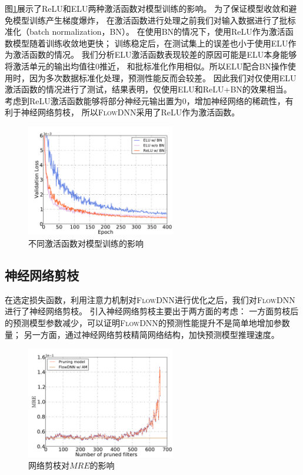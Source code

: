 图\ref{fig:activation}展示了ReLU和ELU两种激活函数对模型训练的影响。
为了保证模型收敛和避免模型训练产生梯度爆炸，
在激活函数进行处理之前我们对输入数据进行了批标准化（batch normalization，BN）。
在使用BN的情况下，使用ReLU作为激活函数模型随着训练收敛地更快；
训练稳定后，在测试集上的误差也小于使用ELU作为激活函数的情况。
我们分析ELU激活函数表现较差的原因可能是ELU本身能够将激活单元的输出均值往0推近，
和批标准化作用相似。所以ELU配合BN操作使用时，因为多次数据标准化处理，预测性能反而会较差。
因此我们对仅使用ELU激活函数的情况进行了测试，结果表明，仅使用ELU和ReLU+BN的效果相当。
考虑到ReLU激活函数能够将部分神经元输出置为0，增加神经网络的稀疏性，有利于神经网络剪枝，
所以\textsc{FlowDNN}采用了ReLU作为激活函数。

\begin{figure}[htp]
	\centering
	\includegraphics[width=0.58\textwidth]{./figures/data/activation_comp.pdf}
	\caption{不同激活函数对模型训练的影响}
	\label{fig:activation}	
\end{figure}


\subsection{神经网络剪枝}

在选定损失函数，利用注意力机制对\textsc{FlowDNN}进行优化之后，我们对\textsc{FlowDNN}进行了神经网络剪枝。
引入神经网络剪枝主要出于两方面的考虑：
一方面剪枝后的预测模型参数减少，可以证明\textsc{FlowDNN}的预测性能提升不是简单地增加参数量；
另一方面，通过神经网络剪枝精简网络结构，加快预测模型推理速度。

\begin{figure}[htp]
	\centering
	\includegraphics[width=0.58\textwidth]{./figures/data/pruning_result.pdf}
	\caption{网络剪枝对$MRE$的影响}
	\label{fig:pruning_result}	
\end{figure}

